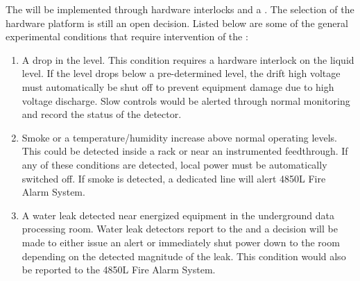 The  will be implemented through hardware interlocks and a
.  The selection of the  hardware platform is
still an open decision.  Listed below are some of the general
 experimental conditions that require intervention of the
:
\begin{enumerate}
 \item A drop in the  level.  This condition requires a hardware
   interlock on the liquid level.  If the level drops below a
   pre-determined level, the drift high voltage must automatically be 
   shut off to prevent equipment damage due to high voltage discharge.  Slow controls would be
   alerted through normal monitoring and record the status of the detector.
 \item Smoke or a temperature/humidity increase above normal operating
   levels. This could be detected inside a rack or near an instrumented
   feedthrough.  If any of these conditions are detected, local
   power must be automatically switched off. If smoke is detected, a
   dedicated line will alert 4850L Fire Alarm System.
 \item A water leak detected near energized equipment in the 
   underground data processing room.  Water leak detectors 
   report to the   and a decision will be made to either
   issue an alert or immediately shut power down to the room depending
   on the detected magnitude of the leak.  This condition would also be reported
   to the 4850L Fire Alarm System.
\end{enumerate}




